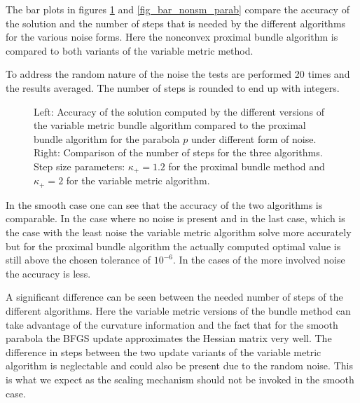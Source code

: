 The bar plots in figures \ref{fig_bar_parab} and \ref{fig_bar_nonsm_parab} compare the accuracy of the solution and the number of steps that is needed by the different algorithms for the various noise forms. Here the nonconvex proximal bundle algorithm is compared to both variants of the variable metric method.

To address the random nature of the noise the tests are performed 20 times and the results averaged. The number of steps is rounded to end up with integers.

\begin{figure}[ht]
	\begin{subfigure}[t]{0.49\textwidth}
	\end{subfigure}
	\begin{subfigure}[t]{0.49\textwidth}
	\end{subfigure}
	\caption{Left: Accuracy of the solution computed by the different versions of the variable metric bundle algorithm compared to the proximal bundle algorithm for the parabola \(p\) under different form of noise.\\
	Right: Comparison of the number of steps for the three algorithms.\\
	Step size parameters: \(\kappa_+ = 1.2\) for the proximal bundle method and \(\kappa_+ = 2\) for the variable metric algorithm. }
	\label{fig_bar_parab}
\end{figure}

In the smooth case one can see that the accuracy of the two algorithms is comparable. In the case where no noise is present and in the last case, which is the case with the least noise the variable metric algorithm solve more accurately but for the proximal bundle algorithm the actually computed optimal value is still above the chosen tolerance of \(10^{-6}\).
In the cases of the more involved noise the accuracy is less.

A significant difference can be seen between the needed number of steps of the different algorithms. Here the variable metric versions of the bundle method can take advantage of the curvature information and the fact that for the smooth parabola the BFGS update approximates the Hessian matrix very well.
The difference in steps between the two update variants of the variable metric algorithm is neglectable and could also be present due to the random noise. This is what we expect as the scaling mechanism should not be invoked in the smooth case.

